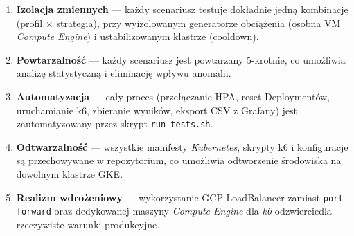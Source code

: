 \begin{enumerate}
  \item \textbf{Izolacja zmiennych} — każdy scenariusz testuje dokładnie jedną kombinację (profil $\times$ strategia), przy wyizolowanym generatorze obciążenia (osobna VM \textit{Compute Engine}) i ustabilizowanym klastrze (cooldown).
  \item \textbf{Powtarzalność} — każdy scenariusz jest powtarzany 5-krotnie, co umożliwia analizę statystyczną i eliminację wpływu anomalii.
  \item \textbf{Automatyzacja} — cały proces (przełączanie HPA, reset Deploymentów, uruchamianie k6, zbieranie wyników, eksport CSV z Grafany) jest zautomatyzowany przez skrypt \texttt{run-tests.sh}.
  \item \textbf{Odtwarzalność} — wszystkie manifesty \textit{Kubernetes}, skrypty k6 i konfiguracje są przechowywane w repozytorium, co umożliwia odtworzenie środowiska na dowolnym klastrze GKE.
  \item \textbf{Realizm wdrożeniowy} — wykorzystanie GCP LoadBalancer zamiast \texttt{port-forward} oraz dedykowanej maszyny \textit{Compute Engine} dla \textit{k6} odzwierciedla rzeczywiste warunki produkcyjne.
\end{enumerate}
